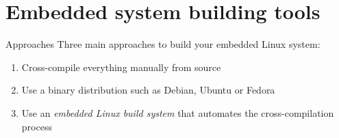 \section{Embedded system building tools}

\begin{frame}{Approaches}
  Three main approaches to build your embedded Linux system:
  \begin{enumerate}
  \item Cross-compile everything manually from source
  \item Use a binary distribution such as Debian, Ubuntu or Fedora
  \item Use an {\em embedded Linux build system} that automates the
    cross-compilation process
  \end{enumerate}
\end{frame}


